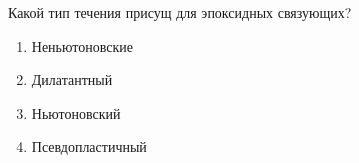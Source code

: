 
Какой тип течения присущ для эпоксидных связующих?

\begin{enumerate}
    \item Неньютоновские
    \item Дилатантный
    \item Ньютоновский
    \item Псевдопластичный
\end{enumerate}